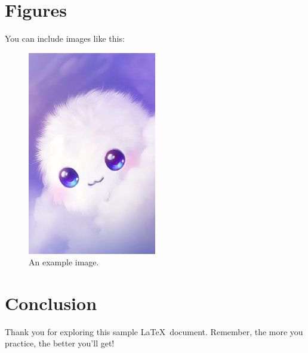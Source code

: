 \documentclass[12pt]{article}
\begin{document}
\section{Figures}
You can include images like this:
\begin{figure}[h!]
\centering
  \includegraphics[width=0.5\textwidth]{images/sample.jpg}
\caption{An example image.}
\label{fig:example_figure}
\end{figure}

\section{Conclusion}
Thank you for exploring this sample \LaTeX\ document. Remember, the more you practice, the better you'll get!
\end{document}
